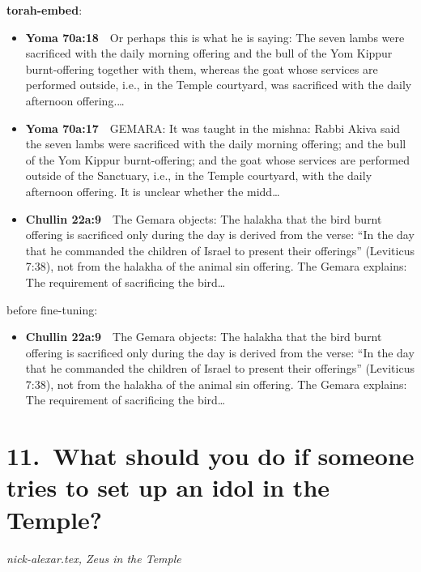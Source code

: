 \documentclass[11pt,a4paper]{article}
\begin{document}
{\color{quiet}\small\textbf{torah-embed}:}
\begin{itemize}[leftmargin=1.2em,itemsep=3pt]
\item {\color{ref}\textbf{Yoma 70a:18}}\ \ Or perhaps this is what he is saying: The seven lambs were sacrificed with the daily morning offering and the bull of the Yom Kippur burnt-offering together with them, whereas the goat whose services are performed outside, i.e., in the Temple courtyard, was sacrificed with the daily afternoon offering.\ldots
\item {\color{ref}\textbf{Yoma 70a:17}}\ \ GEMARA: It was taught in the mishna: Rabbi Akiva said the seven lambs were sacrificed with the daily morning offering; and the bull of the Yom Kippur burnt-offering; and the goat whose services are performed outside of the Sanctuary, i.e., in the Temple courtyard, with the daily afternoon offering. It is unclear whether the midd\ldots
\item {\color{ref}\textbf{Chullin 22a:9}}\ \ The Gemara objects: The halakha that the bird burnt offering is sacrificed only during the day is derived from the verse: “In the day that he commanded the children of Israel to present their offerings” (Leviticus 7:38), not from the halakha of the animal sin offering. The Gemara explains: The requirement of sacrificing the bird\ldots
\end{itemize}
{\color{quiet}\small before fine-tuning:}
\begin{itemize}[leftmargin=1.2em]
\item {\color{ref}\textbf{Chullin 22a:9}}\ \ The Gemara objects: The halakha that the bird burnt offering is sacrificed only during the day is derived from the verse: “In the day that he commanded the children of Israel to present their offerings” (Leviticus 7:38), not from the halakha of the animal sin offering. The Gemara explains: The requirement of sacrificing the bird\ldots
\end{itemize}

\section*{11.\ What should you do if someone tries to set up an idol in the Temple?}
{\color{quiet}\small\textit{nick-alexar.tex, Zeus in the Temple}}
\end{document}
